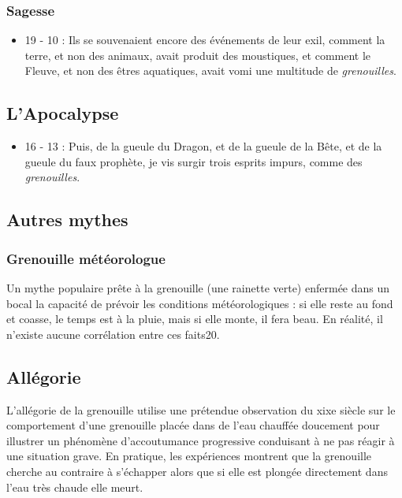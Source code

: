\subsubsection{Sagesse}
\begin{itemize}
\item 19 - 10 : Ils se souvenaient encore des événements de leur exil, comment la terre, et non des animaux, avait produit des moustiques, et comment le Fleuve, et non des êtres aquatiques, avait vomi une multitude de \textit{grenouilles}.
\end{itemize}
\subsection{L'Apocalypse}
\begin{itemize}
\item 16 - 13 : Puis, de la gueule du Dragon, et de la gueule de la Bête, et de la gueule du faux prophète, je vis surgir trois esprits impurs, comme des \textit{grenouilles}.
\end{itemize}
\subsection{Autres mythes}
\subsubsection{Grenouille météorologue}
Un mythe populaire prête à la grenouille (une rainette verte) enfermée dans un bocal la capacité de prévoir les conditions météorologiques : si elle reste au fond et coasse, le temps est à la pluie, mais si elle monte, il fera beau. En réalité, il n'existe aucune corrélation entre ces faits20.
\subsection{Allégorie}
L'allégorie de la grenouille utilise une prétendue observation du xixe siècle sur le comportement d'une grenouille placée dans de l'eau chauffée doucement pour illustrer un phénomène d'accoutumance progressive conduisant à ne pas réagir à une situation grave. En pratique, les expériences montrent que la grenouille cherche au contraire à s'échapper alors que si elle est plongée directement dans l'eau très chaude elle meurt.

